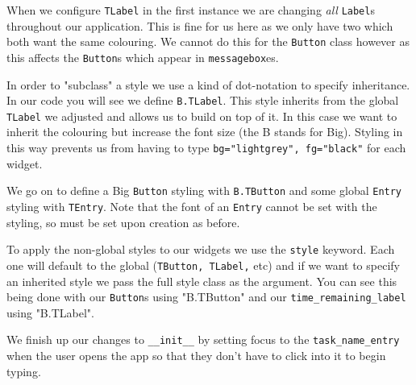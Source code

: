 \documentclass[a4paper,11pt,openany]{book}
\begin{document}
\vspace{5mm}

When we configure \lstinline[columns=fixed]{TLabel} in the first instance we are changing \textit{all} \lstinline[columns=fixed]{Label}s throughout our application. This is fine for us here as we only have two which both want the same colouring. We cannot do this for the \lstinline[columns=fixed]{Button} class however as this affects the \lstinline[columns=fixed]{Button}s which appear in \lstinline[columns=fixed]{messagebox}es. 

\vspace{5mm}

In order to "subclass" a style we use a kind of dot-notation to specify inheritance. In our code you will see we define \lstinline[columns=fixed]{B.TLabel}. This style inherits from the global \lstinline[columns=fixed]{TLabel} we adjusted and allows us to build on top of it. In this case we want to inherit the colouring but increase the font size (the B stands for Big). Styling in this way prevents us from having to type \lstinline[columns=fixed]{bg="lightgrey", fg="black"} for each widget. 

\vspace{5mm}

We go on to define a Big \lstinline[columns=fixed]{Button} styling with \lstinline[columns=fixed]{B.TButton} and some global \lstinline[columns=fixed]{Entry} styling with \lstinline[columns=fixed]{TEntry}. Note that the font of an \lstinline[columns=fixed]{Entry} cannot be set with the styling, so must be set upon creation as before. 

\vspace{5mm}

To apply the non-global styles to our widgets we use the \lstinline[columns=fixed]{style} keyword. Each one will default to the global (\lstinline[columns=fixed]{TButton, TLabel,} etc) and if we want to specify an inherited style we pass the full style class as the argument. You can see this being done with our \lstinline[columns=fixed]{Button}s using "B.TButton" and our \lstinline[columns=fixed]{time_remaining_label} using "B.TLabel". 

\vspace{5mm}

We finish up our changes to \lstinline[columns=fixed]{__init__} by setting focus to the \lstinline[columns=fixed]{task_name_entry} when the user opens the app so that they don't have to click into it to begin typing. 
\end{document}
